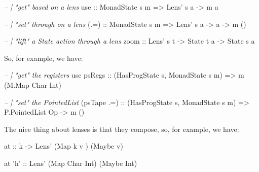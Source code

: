 \documentclass[]{article}
\newenvironment{Shaded}{}{}
\newcommand{\CharTok}[1]{\textcolor[rgb]{0.25,0.44,0.63}{#1}}
\newcommand{\CommentTok}[1]{\textcolor[rgb]{0.38,0.63,0.69}{\textit{#1}}}
\newcommand{\DataTypeTok}[1]{\textcolor[rgb]{0.56,0.13,0.00}{#1}}
\newcommand{\FunctionTok}[1]{\textcolor[rgb]{0.02,0.16,0.49}{#1}}
\newcommand{\NormalTok}[1]{#1}
\newcommand{\OtherTok}[1]{\textcolor[rgb]{0.00,0.44,0.13}{#1}}
\begin{document}
\begin{Shaded}
\begin{Highlighting}[]
\CommentTok{-- | "get" based on a lens}
\OtherTok{use   ::} \DataTypeTok{MonadState}\NormalTok{ s m }\OtherTok{=>} \DataTypeTok{Lens'}\NormalTok{ s a }\OtherTok{->}\NormalTok{ m a}

\CommentTok{-- | "set" through on a lens}
\OtherTok{(.=)  ::} \DataTypeTok{MonadState}\NormalTok{ s m }\OtherTok{=>} \DataTypeTok{Lens'}\NormalTok{ s a }\OtherTok{->}\NormalTok{ a }\OtherTok{->}\NormalTok{ m ()}

\CommentTok{-- | "lift" a State action through a lens}
\OtherTok{zoom  ::} \DataTypeTok{Lens'}\NormalTok{ s t }\OtherTok{->} \DataTypeTok{State}\NormalTok{ t a }\OtherTok{->} \DataTypeTok{State}\NormalTok{ s a}
\end{Highlighting}
\end{Shaded}

So, for example, we have:

\begin{Shaded}
\begin{Highlighting}[]
\CommentTok{-- | "get" the registers}
\NormalTok{use}\OtherTok{ psRegs  ::}\NormalTok{ (}\DataTypeTok{HasProgState}\NormalTok{ s, }\DataTypeTok{MonadState}\NormalTok{ s m) }\OtherTok{=>}\NormalTok{ m (}\DataTypeTok{M.Map} \DataTypeTok{Char} \DataTypeTok{Int}\NormalTok{)}

\CommentTok{-- | "set" the PointedList}
\NormalTok{(psTape }\FunctionTok{.=}\NormalTok{)}\OtherTok{ ::}\NormalTok{ (}\DataTypeTok{HasProgState}\NormalTok{ s, }\DataTypeTok{MonadState}\NormalTok{ s m) }\OtherTok{=>} \DataTypeTok{P.PointedList} \DataTypeTok{Op} \OtherTok{->}\NormalTok{ m ()}
\end{Highlighting}
\end{Shaded}

The nice thing about lenses is that they compose, so, for example, we have:

\begin{Shaded}
\begin{Highlighting}[]
\OtherTok{at ::}\NormalTok{ k }\OtherTok{->} \DataTypeTok{Lens'}\NormalTok{ (}\DataTypeTok{Map}\NormalTok{ k    v  ) (}\DataTypeTok{Maybe}\NormalTok{ v)}

\NormalTok{at }\CharTok{'h'}\OtherTok{  ::} \DataTypeTok{Lens'}\NormalTok{ (}\DataTypeTok{Map} \DataTypeTok{Char} \DataTypeTok{Int}\NormalTok{) (}\DataTypeTok{Maybe} \DataTypeTok{Int}\NormalTok{)}
\end{Highlighting}
\end{Shaded}
\end{document}
